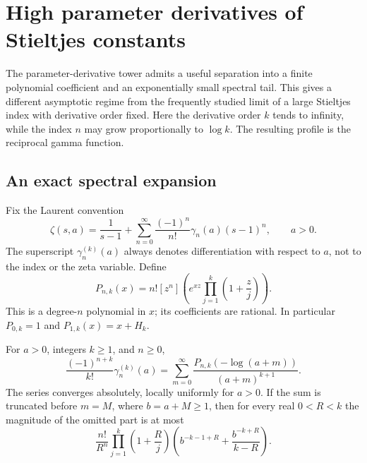 \section{High parameter derivatives of Stieltjes constants}
\label{sec:asymptotics}

The parameter-derivative tower admits a useful separation into a
finite polynomial coefficient and an exponentially small spectral
tail. This gives a different asymptotic regime from the frequently
studied limit of a large Stieltjes index with derivative order fixed.
Here the derivative order \(k\) tends to infinity, while the index
\(n\) may grow proportionally to \(\log k\). The resulting profile is
the reciprocal gamma function.

\subsection{An exact spectral expansion}

Fix the Laurent convention
\begin{equation}\label{eq:stieltjes-convention}
\zeta(s,a)=\frac{1}{s-1}
 +\sum_{n=0}^{\infty}\frac{(-1)^n}{n!}\gamma_n(a)(s-1)^n,
\qquad a>0.
\end{equation}
The superscript \(\gamma_n^{(k)}(a)\) always denotes differentiation
with respect to \(a\), not to the index or the zeta variable. Define
\begin{equation}\label{eq:coefficient-polynomial}
P_{n,k}(x)=n![z^n]\left(e^{xz}\prod_{j=1}^{k}
                  \left(1+\frac zj\right)\right).
\end{equation}
This is a degree-\(n\) polynomial in \(x\); its coefficients are
rational. In particular \(P_{0,k}=1\) and
\(P_{1,k}(x)=x+H_k\).

\begin{theorem}
\label{thm:spectral}
For \(a>0\), integers \(k\ge1\), and \(n\ge0\),
\begin{equation}\label{eq:spectral}
\frac{(-1)^{n+k}}{k!}\gamma_n^{(k)}(a)
=\sum_{m=0}^{\infty}
 \frac{P_{n,k}(-\log(a+m))}{(a+m)^{k+1}}.
\end{equation}
The series converges absolutely, locally uniformly for \(a>0\).
If the sum is truncated before \(m=M\), where \(b=a+M\ge1\),
then for every real \(0<R<k\) the magnitude of the omitted part is at
most
\begin{equation}\label{eq:spectral-tail}
\frac{n!}{R^n}\prod_{j=1}^{k}\left(1+\frac Rj\right)
\left(b^{-k-1+R}+\frac{b^{-k+R}}{k-R}\right).
\end{equation}
\end{theorem}

